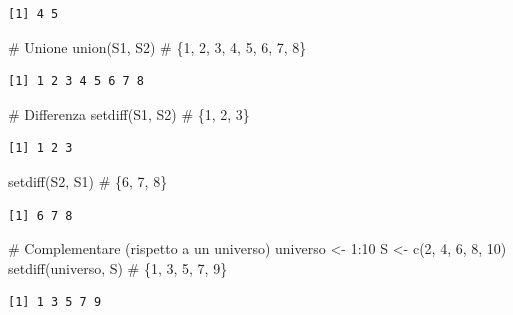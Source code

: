 \documentclass[
  italian,
  letterpaper,
  a4paper,
  11pt,
  open=any]{scrbook}
\newenvironment{Shaded}{\begin{snugshade}}{\end{snugshade}}
\newcommand{\CommentTok}[1]{\textcolor[rgb]{0.37,0.37,0.37}{#1}}
\newcommand{\DecValTok}[1]{\textcolor[rgb]{0.68,0.00,0.00}{#1}}
\newcommand{\FunctionTok}[1]{\textcolor[rgb]{0.28,0.35,0.67}{#1}}
\newcommand{\NormalTok}[1]{\textcolor[rgb]{0.00,0.23,0.31}{#1}}
\newcommand{\OtherTok}[1]{\textcolor[rgb]{0.00,0.23,0.31}{#1}}
\newcommand{\SpecialCharTok}[1]{\textcolor[rgb]{0.37,0.37,0.37}{#1}}
\theoremstyle{plain}
\theoremstyle{definition}
\theoremstyle{definition}
\theoremstyle{remark}
\begin{document}
\begin{verbatim}
[1] 4 5
\end{verbatim}

\begin{Shaded}
\begin{Highlighting}[]
\CommentTok{\# Unione}
\FunctionTok{union}\NormalTok{(S1, S2)               }\CommentTok{\# \{1, 2, 3, 4, 5, 6, 7, 8\}}
\end{Highlighting}
\end{Shaded}

\begin{verbatim}
[1] 1 2 3 4 5 6 7 8
\end{verbatim}

\begin{Shaded}
\begin{Highlighting}[]
\CommentTok{\# Differenza}
\FunctionTok{setdiff}\NormalTok{(S1, S2)             }\CommentTok{\# \{1, 2, 3\}}
\end{Highlighting}
\end{Shaded}

\begin{verbatim}
[1] 1 2 3
\end{verbatim}

\begin{Shaded}
\begin{Highlighting}[]
\FunctionTok{setdiff}\NormalTok{(S2, S1)             }\CommentTok{\# \{6, 7, 8\}}
\end{Highlighting}
\end{Shaded}

\begin{verbatim}
[1] 6 7 8
\end{verbatim}

\begin{Shaded}
\begin{Highlighting}[]
\CommentTok{\# Complementare (rispetto a un universo)}
\NormalTok{universo }\OtherTok{\textless{}{-}} \DecValTok{1}\SpecialCharTok{:}\DecValTok{10}
\NormalTok{S }\OtherTok{\textless{}{-}} \FunctionTok{c}\NormalTok{(}\DecValTok{2}\NormalTok{, }\DecValTok{4}\NormalTok{, }\DecValTok{6}\NormalTok{, }\DecValTok{8}\NormalTok{, }\DecValTok{10}\NormalTok{)}
\FunctionTok{setdiff}\NormalTok{(universo, S)        }\CommentTok{\# \{1, 3, 5, 7, 9\}}
\end{Highlighting}
\end{Shaded}

\begin{verbatim}
[1] 1 3 5 7 9
\end{verbatim}
\end{document}
